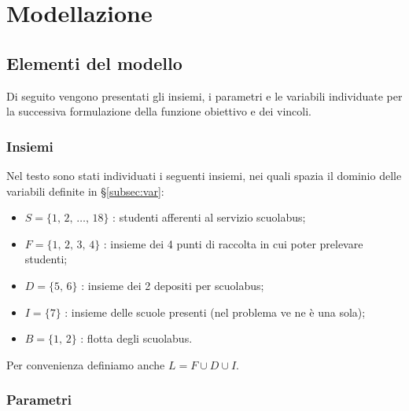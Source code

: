 
\chapter{Modellazione}

\ifpdf
    \graphicspath{{Chapter3/Figs/Raster/}{Chapter3/Figs/PDF/}{Chapter3/Figs/}}
\else
    \graphicspath{{Chapter3/Figs/Vector/}{Chapter3/Figs/}}
\fi
\section{Elementi del modello}
Di seguito vengono presentati gli insiemi, i parametri e le variabili individuate per la successiva formulazione della funzione obiettivo e dei vincoli.
\subsection{Insiemi}
Nel testo sono stati individuati i seguenti insiemi, nei quali spazia il dominio delle variabili definite in §\ref{subsec:var}:
\begin{itemize}
  \item $S = \{1,\, 2,\, \ldots,\, 18\}$ : studenti afferenti al servizio scuolabus;%
  \item $F = \{1,\, 2,\, 3,\, 4\}$ : insieme dei 4 punti di raccolta in cui poter prelevare studenti;
  \item $D = \{5,\, 6\}$ : insieme dei 2 depositi per scuolabus;
  \item $I = \{7\}$ : insieme delle scuole presenti (nel problema ve ne è una sola);
  \item $B = \{1,\,2\}$ : flotta degli scuolabus.
\end{itemize}
Per convenienza definiamo anche $L = F \cup D \cup I$.

\subsection{Parametri}

